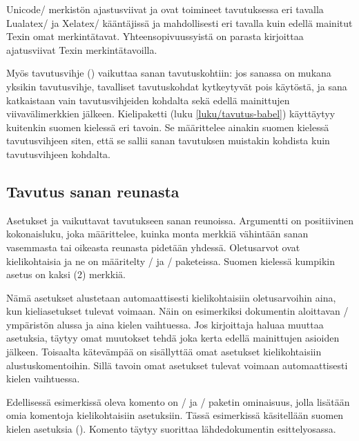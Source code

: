Unicode\-/ merkistön ajastusviivat  ja
 ovat toimineet tavutuksessa eri tavalla
Lualatex\-/{} ja Xelatex\-/ kääntäjissä ja mahdollisesti eri tavalla
kuin edellä mainitut Texin omat merkintätavat. Yhteensopivuussyistä on
parasta kirjoittaa ajatusviivat Texin merkintätavoilla.

Myös tavutusvihje (\komento{-}) vaikuttaa sanan tavutuskohtiin: jos
sanassa on mukana yksikin tavutusvihje, tavalliset tavutuskohdat
kytkeytyvät pois käytöstä, ja sana katkaistaan vain tavutusvihjeiden
kohdalta sekä edellä mainittujen viivavälimerkkien jälkeen. Kielipaketti
 (luku \ref{luku/tavutus-babel}) käyttäytyy kuitenkin
suomen kielessä eri tavoin. Se määrittelee ainakin suomen kielessä
tavutusvihjeen siten, että se sallii sanan tavutuksen muistakin kohdista
kuin tavutusvihjeen kohdalta.

\subsection{Tavutus sanan reunasta}
\label{luku/tavutus-reunasta}

Asetukset  ja
 vaikuttavat tavutukseen sanan
reunoissa. Argumentti  on positiivinen kokonaisluku, joka
määrittelee, kuinka monta merkkiä vähintään sanan vasemmasta tai
oikeasta reunasta pidetään yhdessä. Oletusarvot ovat kielikohtaisia ja
ne on määritelty \-/{} ja \-/
paketeissa. Suomen kielessä kumpikin asetus on kaksi (2) merkkiä.

Nämä asetukset alustetaan automaattisesti kielikohtaisiin oletusarvoihin
aina, kun kieliasetukset tulevat voimaan. Näin on esimerkiksi dokumentin
aloittavan \-/ ympäristön alussa ja aina kielen
vaihtuessa. Jos kirjoittaja haluaa muuttaa asetuksia, täytyy omat
muutokset tehdä joka kerta edellä mainittujen asioiden jälkeen.
Toisaalta kätevämpää on sisällyttää omat asetukset kielikohtaisiin
alustuskomentoihin. Sillä tavoin omat asetukset tulevat voimaan
automaattisesti kielen vaihtuessa.

\begin{koodilohkosis}
\end{koodilohkosis}

\noindent
Edellisessä esimerkissä oleva komento  on
\-/{} ja \-/ paketin ominaisuus,
jolla lisätään omia komentoja kielikohtaisiin asetuksiin. Tässä
esimerkissä käsitellään suomen kielen asetuksia
(). Komento täytyy suorittaa lähdedokumentin
esittelyosassa.

